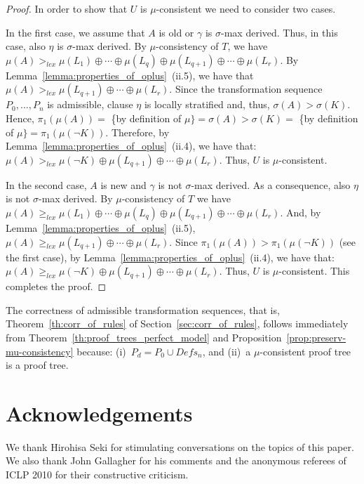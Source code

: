 \documentclass[english]{tlp}
\renewcommand{\mathit}{\displaystyle}
\begin{document}
\begin{proof}
In order to show that $U$ is $\mu$-consistent we need to consider two cases. 

In
the first case, we assume that $A$ is old or $\gamma$ is $\sigma$-max derived. Thus, in this case, also $\eta$ is $\sigma$-max derived. By $\mu$-consistency of $T$, we
have $\mu(A)>_{\mathit lex}\mu(L_1)\oplus\cdots\oplus\mu(L_q)\oplus
\mu(L_{q+1})\oplus\cdots \oplus\mu(L_r)$. By
Lemma~\ref{lemma:properties_of_oplus}~(ii.5), we have that $\mu(A)>_{\mathit
lex}\mu(L_{q+1})\oplus\cdots\oplus\mu(L_r)$. Since the transformation sequence $P_0,\ldots,P_n$ is admissible, clause $\eta$ is locally
stratified and, thus, $\sigma(A)> \sigma(K)$. Hence,
$\pi_1(\mu(A))=$ \{by definition of $\mu\}=\sigma(A)> \sigma(K)=$
 \{by definition of $\mu\}= \pi_1(\mu(\neg K))$. Therefore, by 
Lemma~\ref{lemma:properties_of_oplus}~(ii.4), we have that: $\mu(A)>_{\mathit lex}\mu(\neg K)\oplus\mu(L_{q+1})\oplus\cdots\oplus\mu(L_r)$. Thus, $U$ is 
\mbox{$\mu$-consistent.}

In the second case, $A$ is new and $\gamma$ is not $\sigma$-max derived. As a
consequence, also $\eta$ is not $\sigma$-max derived. By $\mu$-consistency of
$T$ we have $\mu(A)\geq_{\mathit lex}\mu(L_1)\oplus\cdots\oplus\mu(L_q)\oplus
\mu(L_{q+1})\oplus\cdots\oplus\mu(L_r)$. And, by
Lemma~\ref{lemma:properties_of_oplus}~(ii.5), $\mu(A)\geq_{\mathit
lex}\mu(L_{q+1})\oplus\cdots\oplus\mu(L_r)$. Since $\pi_1(\mu(A))>\pi_1(\mu(\neg
K))$ (see the first case), 
by Lemma~\ref{lemma:properties_of_oplus}~(ii.4), we have that:
$\mu(A)\geq_{\mathit lex}\mu(\neg
K)\oplus\mu(L_{q+1})\oplus\cdots\oplus\mu(L_r)$. Thus, $U$ is
$\mu$-consistent. This completes the proof.
\end{proof}

\medskip
The correctness of admissible transformation sequences, that is,
Theorem~\ref{th:corr_of_rules} of
Section~\ref{sec:corr_of_rules}, follows immediately from
Theorem~\ref{th:proof_trees_perfect_model} and
Proposition~\ref{prop:preserv-mu-consistency} because: (i)~$P_d=
P_0\cup \mathit{Defs_n}$, and (ii)~a $\mu$-consistent proof tree is a
proof tree.

\section*{Acknowledgements}
We thank Hirohisa Seki for stimulating conversations on
the topics of this paper. We also thank John Gallagher for
his comments and 
the anonymous referees of ICLP 2010 for their constructive criticism.
\end{document}
